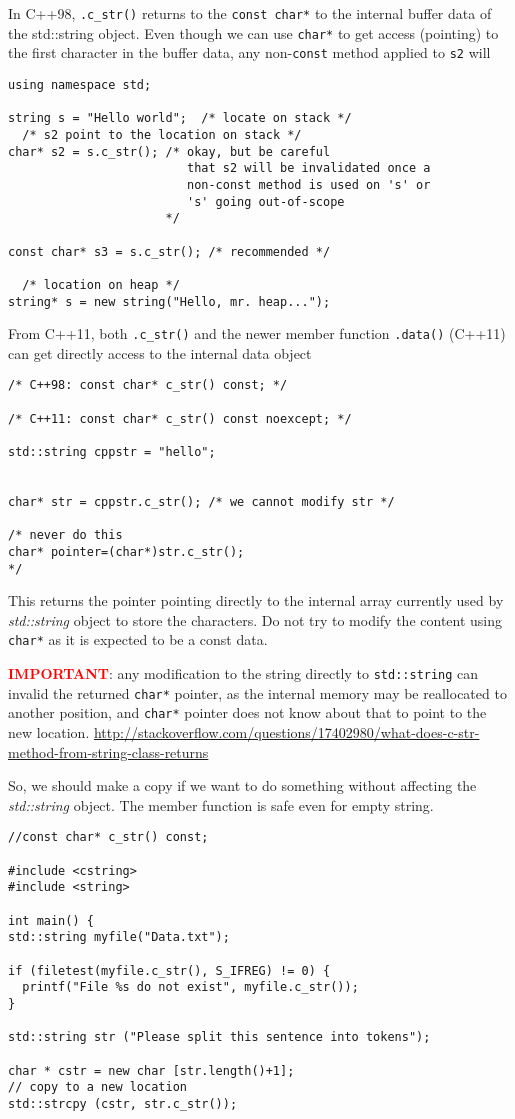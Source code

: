 In C++98, \verb!.c_str()! returns to the \verb!const char*! to the internal
buffer data of the std::string object. Even though we can use \verb!char*! to
get access (pointing) to the first character in the buffer data, any
non-\verb!const! method applied to \verb!s2! will 
\begin{verbatim}
using namespace std;

string s = "Hello world";  /* locate on stack */
  /* s2 point to the location on stack */
char* s2 = s.c_str(); /* okay, but be careful 
                         that s2 will be invalidated once a
                         non-const method is used on 's' or
                         's' going out-of-scope
                      */

const char* s3 = s.c_str(); /* recommended */

  /* location on heap */
string* s = new string("Hello, mr. heap...");
\end{verbatim}

From C++11, both \verb!.c_str()! and the newer member function
\verb!.data()! (C++11) can get directly access to the internal data object

\begin{verbatim}
/* C++98: const char* c_str() const; */

/* C++11: const char* c_str() const noexcept; */

std::string cppstr = "hello";


char* str = cppstr.c_str(); /* we cannot modify str */

/* never do this
char* pointer=(char*)str.c_str();
*/
\end{verbatim}
This returns the pointer pointing directly to the internal array currently used
by {\it std::string} object to store the characters. Do not try to modify the
content using \verb!char*! as it is expected to be a const data.

\textcolor{red}{\bf IMPORTANT}: any modification to the string directly to
\verb!std::string! can invalid the returned \verb!char*! pointer, as the internal memory may be
reallocated to another position, and \verb!char*! pointer does not know about
that to point to the new location.
\url{http://stackoverflow.com/questions/17402980/what-does-c-str-method-from-string-class-returns}

So, we should make a copy if we want to do something without affecting
the {\it std::string} object. The member function is safe even for empty string.
\begin{verbatim}
//const char* c_str() const;

#include <cstring>
#include <string>

int main() {
std::string myfile("Data.txt");

if (filetest(myfile.c_str(), S_IFREG) != 0) {
  printf("File %s do not exist", myfile.c_str());
}

std::string str ("Please split this sentence into tokens");

char * cstr = new char [str.length()+1];
// copy to a new location
std::strcpy (cstr, str.c_str());
\end{verbatim}

